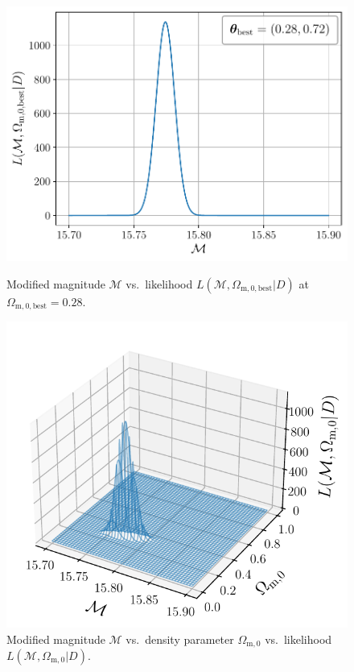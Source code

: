\begin{figure}
    \begin{minipage}{8cm}
        \centering
        \includegraphics[scale=0.55]{figures/plots/PDF/MWE-likelihood_mod-absolute-magnitude-vs-likelihood-at-Omega-m0-best.pdf}
        \caption{Modified magnitude $\mathcal{M}$ vs.\ likelihood $L(\mathcal{M}, \Omega_{\text{m}, 0, \text{best}} \vert D)$ at $\Omega_{\text{m}, 0, \text{best}} = 0.28$.}
        \label{fig:MWE-likelihood_mod-absolute-magnitude-vs-likelihood-at-Omega-m0-best}
    \end{minipage}
    \hspace*{1cm}
    \begin{minipage}{8cm}
        \centering
        \includegraphics[scale=0.66]{figures/plots/PDF/MWE-likelihood_mod-absolute-magnitude-vs-Omega-m0-vs-likelihood.pdf}
        \caption{Modified magnitude $\mathcal{M}$ vs.\ density parameter $\Omega_{\text{m},0}$ vs.\ likelihood $L(\mathcal{M}, \Omega_{\text{m},0} \vert D)$.}
        \label{fig:MWE-likelihood_mod-absolute-magnitude-vs-Omega-m0-vs-likelihood}
    \end{minipage}
\end{figure}

